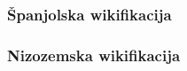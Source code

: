 \documentclass{beamer}
\begin{document}
\begin{frame}
\frametitle{Španjolska wikifikacija}
\begin{center}
\end{center}
\end{frame}


\begin{frame}
\frametitle{Nizozemska wikifikacija}
\begin{center}
\end{center}
\end{frame}
\end{document}
